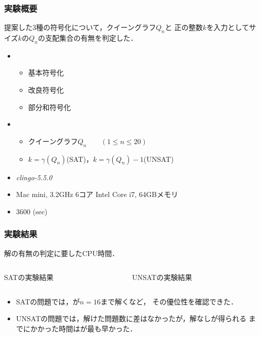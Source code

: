 \documentclass[dvipdfmx,10pt]{beamer}
\begin{document}
\begin{frame}\frametitle{実験概要}
 \begin{block}{}
  提案した3種の符号化について，クイーングラフ$Q_n$と
  正の整数$k$を入力としてサイズ$k$の$Q_{n}$の支配集合の有無を判定した．
 \end{block}
 \begin{itemize}
  \item {}
	\begin{itemize}
	 \item 基本符号化
	 \item 改良符号化
	 \item 部分和符号化
	\end{itemize}
  \item {}
	\begin{itemize}
	 \item クイーングラフ$Q_{n} \qquad (1 \leq n \leq 20)$
	 \item $k=\gamma(Q_{n})$\quad (SAT)，$k=\gamma(Q_{n})-1$\quad (UNSAT)
	\end{itemize}
  \item {} \textit{clingo-5.5.0}
  \item {} Mac mini, 3.2GHz 6コア Intel Core i7, 64GBメモリ
  \item {} 3600 (sec)
 \end{itemize}
\end{frame}

%
%

\begin{frame}\frametitle{実験結果}
 \begin{block}{}
  解の有無の判定に要したCPU時間．
 \end{block}
 \begin{columns}
  \begin{column}{0.50\textwidth}
   \begin{table}[htbp]
    \caption{SATの実験結果}
    \scalebox{0.7}{
    }
   \end{table}
  \end{column}
  \begin{column}{0.50\textwidth}
   \begin{table}[htbp]
    \caption{UNSATの実験結果}
    \scalebox{0.7}{
    }
   \end{table}
  \end{column}
 \end{columns} 
 \begin{itemize}
  \item SATの問題では，が$n=16$まで解くなど，
	その優位性を確認できた．
  \item UNSATの問題では，解けた問題数に差はなかったが，解なしが得られる
	までにかかった時間はが最も早かった．
 \end{itemize}
\end{frame}
\end{document}
